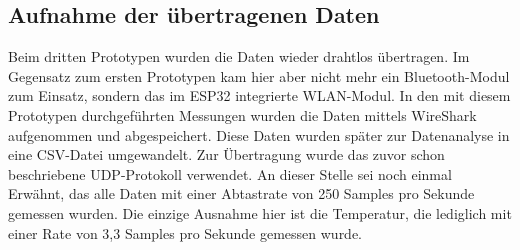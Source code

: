 \subsection{Aufnahme der {\"u}bertragenen Daten} \label{aufnahme-daten-subsec}

Beim dritten Prototypen wurden die Daten wieder drahtlos übertragen. Im Gegensatz zum ersten Prototypen kam hier aber nicht mehr ein Bluetooth-Modul zum Einsatz, sondern das im ESP32 integrierte WLAN-Modul. In den mit diesem Prototypen durchgeführten Messungen wurden die Daten mittels WireShark aufgenommen und abgespeichert. Diese Daten wurden später zur Datenanalyse in eine CSV-Datei umgewandelt. Zur Übertragung wurde das zuvor schon beschriebene UDP-Protokoll  verwendet. An dieser Stelle sei noch einmal Erwähnt, das alle Daten mit einer Abtastrate von 250 Samples pro Sekunde gemessen wurden. Die einzige Ausnahme hier ist die Temperatur, die lediglich mit einer Rate von 3,3 Samples pro Sekunde gemessen wurde. 